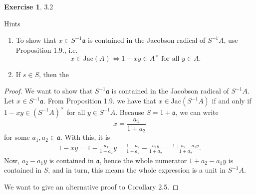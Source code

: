 \documentclass{book}
\theoremstyle{plain}
\theoremstyle{definition}
\newtheorem{exr}[thm]{Exercise}
\theoremstyle{custom_definition}
\begin{document}
\begin{exr}
    3.2

    Hints
    \begin{enumerate}
        \item To show that \(x \in S^{-1}\mathfrak{a}\) is contained in the Jacobson radical of \(S^{-1}A\), use Proposition 1.9., i.e.
        \begin{equation}
            x \in \mathrm{Jac}(A) \iff 1 - xy \in A^\times \text{ for all } y \in A \text{.}
        \end{equation}
        \item If \(s \in S\), then the
    \end{enumerate}
\end{exr}
\begin{proof}
    We want to show that \(S^{-1} \mathfrak{a}\) is contained in the Jacobson radical of \(S^{-1} A\). Let \(x \in S^{-1}\mathfrak{a}\). From Proposition 1.9. we have that \(x \in \mathrm{Jac}(S^{-1} A)\) if and only if \(1 - xy \in (S^{-1}A)^\times\) for all \(y \in S^{-1}A\). Because \(S = 1 + \mathfrak{a}\), we can write
    \begin{equation}
        x = \frac{a_1}{1 + a_2}
    \end{equation}
    for some \(a_1, a_2 \in \mathfrak{a}\). With this, it is
    \begin{align}
        1 - xy = 1 - \frac{a_1}{1 + a_2} y = \frac{1 + a_2}{1 + a_2} - \frac{a_1 y}{1 + a_2} = \frac{1 + a_2 - a_1 y}{1 + a_2} \text{.}
    \end{align}
    Now, \(a_2 - a_1 y\) is contained in \(\mathfrak{a}\), hence the whole numerator \(1 + a_2 - a_1 y\) is contained in \(S\), and in turn, this means the whole expression is a unit in \(S^{-1}A\).

    We want to give an alternative proof to Corollary 2.5.
\end{proof}
\end{document}
